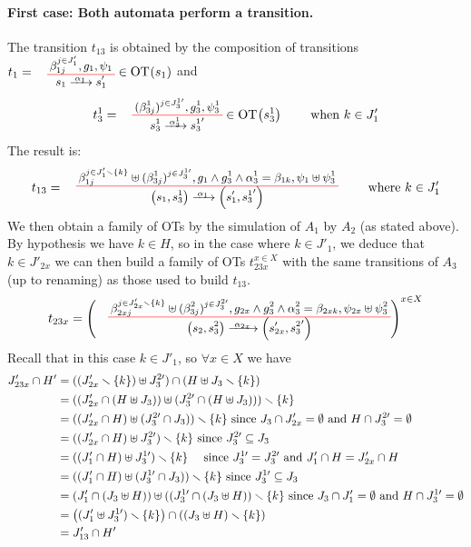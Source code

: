 \documentclass[runningheads]{llncs}
\begin{document}
\begin{enumerate}
\paragraph{First case: Both automata perform a transition.}
The transition $t_{13}$ is obtained by the composition of  transitions $t_1=\OTx{1}{}{1}{1}\in \fOT{s_1}$ and  \[t_3^1=
\OT{ s^1_3}{{s^1_3}'}{\alpha_3^1}{   {(\beta^1_{3j})^{j \in J^{1 \prime}_3} }}{ g^1_3 }{ \psi^1_3}\in \fOT{s^1_3} \qquad \text{ when } k \in J'_{1} 
\] The result is:
\[
t_{13} = \OT{\mpar{s_1, s^1_3}}{\mpar{s'_1, {s^1_3}'}}{\alpha_1}{\beta_{1j}^{j \in J'_1 \setminus \{k\}} \uplus  {(\beta^1_{3j})^{j \in J^{1 \prime}_3} }}{g_1 \wedge g^1_3 \wedge \alpha^1_3 = \beta_{1k}}{\psi_1 \uplus \psi^1_3} \qquad \text{ where } k \in J'_{1} 
\]
We then obtain a family of OTs by the simulation of $A_1$ by $A_2$ (as stated above).
By hypothesis we have $k \in H$, so in the case where $k \in J'_{1}$, we deduce that $k \in J'_{2x}$ we can  then build  a family of OTs $t_{23x}^{x\in X}$ with the same transitions of $A_3$ (up to renaming) as those used to build $t_{13}$.
\[
t_{23x} = \left(\OT{\mpar{s_2, s^2_3}}{\mpar{s'_{2x}, {s^2_3}'}}{\alpha_{2x}}{\beta_{2xj}^{j \in J'_{2x}  \setminus \{k\}} \uplus   {(\beta^2_{3j})^{j \in J^{2 \prime}_3} }}{g_{2x} \wedge g^2_3 \wedge \alpha^2_3 = \beta_{2xk}}{\psi_{2x} \uplus \psi^2_3}
\right)^{x\in X}\]
Recall that in this case  $k \in J'_{1}$, so $\forall x \in X$ we have
\begin{align*}
  J'_{23x} \cap H'  
&=((J'_{2x}  \smallsetminus {\left\{k\right\}})\uplus J^{2 \prime}_{3} ) \cap (H\uplus J_3 \smallsetminus\{k\} )\\
&=((J'_{2x}\cap (H\uplus J_3))\uplus (J^{2 \prime}_{3}\cap (H\uplus J_3)))\smallsetminus {\left\{k\right\}}\\
&=((J'_{2x}\cap H)\uplus (J^{2 \prime}_{3}\cap  J_3))\smallsetminus {\left\{k\right\}}\text{ since } J_3\cap J'_{2x} = \emptyset \text{ and } H\cap J^{2 \prime}_{3} = \emptyset\\
& =((J'_{2x}\cap H)\uplus J^{2 \prime}_{3})\smallsetminus {\left\{k\right\}}\text{ since } J^{2 \prime}_{3}\subseteq J_3\\
& =((J'_1\cap H)\uplus J^{1 \prime}_{3})\smallsetminus {\left\{k\right\}}\quad \text{ since } J^{1 \prime}_{3}=J^{2 \prime}_{3} \text{ and } J'_1 \cap H = J'_{2x} \cap H\\
&= ((J'_1 \cap H) \uplus (J^{1 \prime}_{3} \cap J_3)) \smallsetminus {\left\{k\right\}}\text{ since } J^{1 \prime}_{3}\subseteq J_3\\ 
& = (J'_1\cap (J_3 \uplus H)) \uplus ((J^{1 \prime}_{3} \cap (J_3 \uplus H)) \smallsetminus {\left\{k\right\}} \text{ since } J_3\cap J'_{1} = \emptyset \text{ and } H\cap J^{1 \prime}_{3} = \emptyset\\
		& = {\left((J'_1  \uplus J^{1 \prime}_{3})\smallsetminus {\left\{k\right\}}\right)} \cap {\left((J_{3} \uplus H) \smallsetminus{\left\{k\right\}}\right)}\\
		& = J'_{13} \cap H'
\end{align*}	


\end{enumerate}
\end{document}

